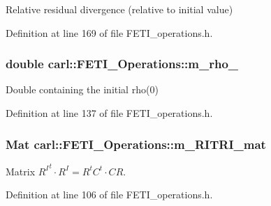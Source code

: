 Relative residual divergence (relative to initial value) 



Definition at line 169 of file F\+E\+T\+I\+\_\+operations.\+h.

\hypertarget{classcarl_1_1_f_e_t_i___operations_a7d44cceb8c3e003f9e8c22972602fcc8}{}
\subsubsection[{m\+\_\+rho\+\_\+0}]{\setlength{\rightskip}{0pt plus 5cm}double carl\+::\+F\+E\+T\+I\+\_\+\+Operations\+::m\+\_\+rho\+\_\hspace{0.3cm}{\ttfamily [protected]}}\label{classcarl_1_1_f_e_t_i___operations_a7d44cceb8c3e003f9e8c22972602fcc8}


Double containing the initial {\ttfamily rho(0)} 



Definition at line 137 of file F\+E\+T\+I\+\_\+operations.\+h.

\hypertarget{classcarl_1_1_f_e_t_i___operations_aaad5dcc66e63627427b79d5e22b3df6f}{}
\subsubsection[{m\+\_\+\+R\+I\+T\+R\+I\+\_\+mat}]{\setlength{\rightskip}{0pt plus 5cm}Mat carl\+::\+F\+E\+T\+I\+\_\+\+Operations\+::m\+\_\+\+R\+I\+T\+R\+I\+\_\+mat\hspace{0.3cm}{\ttfamily [protected]}}\label{classcarl_1_1_f_e_t_i___operations_aaad5dcc66e63627427b79d5e22b3df6f}


Matrix ${R^I}^t \cdot R^I = R^t C^t \cdot C R $. 



Definition at line 106 of file F\+E\+T\+I\+\_\+operations.\+h.

\hypertarget{classcarl_1_1_f_e_t_i___operations_ad6d35bc9b5221d45452fbc8931f22055}{}
